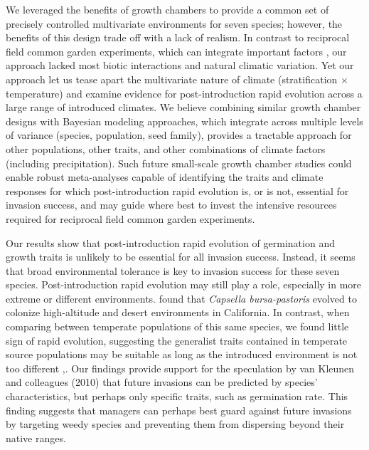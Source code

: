\documentclass[12pt]{article}\usepackage[]{graphicx}\usepackage[]{color}
\begin{document}
	We leveraged the benefits of growth chambers to provide a common set of precisely controlled multivariate environments for seven species; however, the benefits of this design trade off with a lack of realism. In contrast to reciprocal field common garden experiments, which can integrate important factors \parencite{Germain2018,Blois2013}, our approach lacked most biotic interactions and natural climatic variation. Yet our approach let us tease apart the multivariate nature of climate (stratification $\times$ temperature) and examine evidence for post-introduction rapid evolution across a large range of introduced climates. We believe combining similar growth chamber designs with Bayesian modeling approaches, which integrate across multiple levels of variance (species, population, seed family), provides a tractable approach for other populations, other traits, and other combinations of climate factors (including precipitation). Such future small-scale growth chamber studies could enable robust meta-analyses capable of identifying the traits and climate responses for which post-introduction rapid evolution is, or is not, essential for invasion success, and may guide where best to invest the intensive resources required for reciprocal field common garden experiments. %
	
	Our results show that post-introduction rapid evolution of germination and growth traits is unlikely to be essential for all invasion success. Instead, it seems that broad environmental tolerance is key to invasion success for these seven species. Post-introduction rapid evolution may still play a role, especially in more extreme or different environments.  \textcite{Linde2001} found that \textit{Capsella bursa-pastoris} evolved to colonize high-altitude and desert environments in California. In contrast, when comparing between temperate populations of this same species, we found little sign of rapid evolution, suggesting the generalist traits contained in temperate source populations may be suitable as long as the introduced environment is not too different \parencite{Baker1965},. Our findings provide support for  the speculation by van Kleunen and colleagues (2010) that future invasions can be predicted by species' characteristics, but perhaps only specific traits, such as germination rate. This finding suggests that managers can perhaps best guard against future invasions by targeting weedy species and preventing them from dispersing beyond their native ranges. 
	
\end{document}

